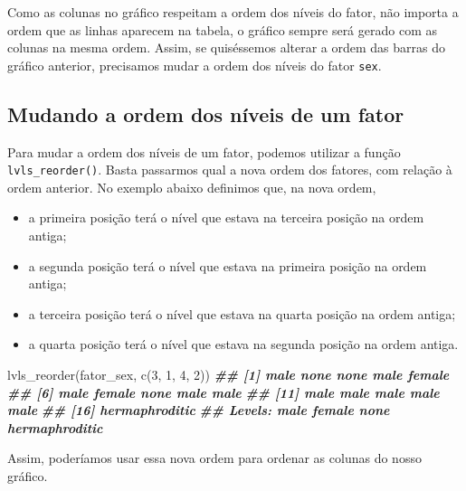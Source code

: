 \documentclass[
]{book}
\newenvironment{Shaded}{\begin{snugshade}}{\end{snugshade}}
\newcommand{\DecValTok}[1]{\textcolor[rgb]{0.00,0.00,0.81}{#1}}
\newcommand{\DocumentationTok}[1]{\textcolor[rgb]{0.56,0.35,0.01}{\textbf{\textit{#1}}}}
\newcommand{\FunctionTok}[1]{\textcolor[rgb]{0.00,0.00,0.00}{#1}}
\newcommand{\NormalTok}[1]{#1}
\begin{document}
Como as colunas no gráfico respeitam a ordem dos níveis do fator, não importa a ordem que as linhas aparecem na tabela, o gráfico sempre será gerado com as colunas na mesma ordem. Assim, se quiséssemos alterar a ordem das barras do gráfico anterior, precisamos mudar a ordem dos níveis do fator \texttt{sex}.

\hypertarget{mudando-a-ordem-dos-nuxedveis-de-um-fator}{%
\subsection{Mudando a ordem dos níveis de um fator}\label{mudando-a-ordem-dos-nuxedveis-de-um-fator}}

Para mudar a ordem dos níveis de um fator, podemos utilizar a função \texttt{lvls\_reorder()}. Basta passarmos qual a nova ordem dos fatores, com relação à ordem anterior. No exemplo abaixo definimos que, na nova ordem,

\begin{itemize}
\item
  a primeira posição terá o nível que estava na terceira posição na ordem antiga;
\item
  a segunda posição terá o nível que estava na primeira posição na ordem antiga;
\item
  a terceira posição terá o nível que estava na quarta posição na ordem antiga;
\item
  a quarta posição terá o nível que estava na segunda posição na ordem antiga.
\end{itemize}

\begin{Shaded}
\begin{Highlighting}[]
\FunctionTok{lvls\_reorder}\NormalTok{(fator\_sex, }\FunctionTok{c}\NormalTok{(}\DecValTok{3}\NormalTok{, }\DecValTok{1}\NormalTok{, }\DecValTok{4}\NormalTok{, }\DecValTok{2}\NormalTok{))}
\DocumentationTok{\#\#  [1] male           none           none           male           female        }
\DocumentationTok{\#\#  [6] male           female         none           male           male          }
\DocumentationTok{\#\# [11] male           male           male           male           male          }
\DocumentationTok{\#\# [16] hermaphroditic}
\DocumentationTok{\#\# Levels: male female none hermaphroditic}
\end{Highlighting}
\end{Shaded}

Assim, poderíamos usar essa nova ordem para ordenar as colunas do nosso gráfico.
\end{document}
